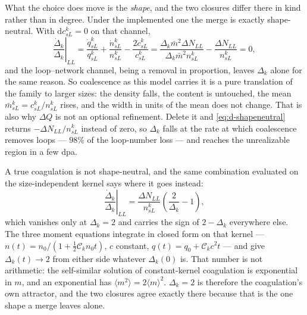 What the choice does move is the \emph{shape}, and the two closures differ there
in kind rather than in degree. Under the implemented one the merge is exactly
shape-neutral. With $\mathrm dc^k_{sL}=0$ on that channel,
\begin{equation}
  \left.\frac{\dot\Delta_k}{\Delta_k}\right|_{LL}
   =\frac{\dot q^k_{sL}}{q^k_{sL}}+\frac{\dot n^k_{sL}}{n^k_{sL}}
    -\frac{2\dot c^k_{sL}}{c^k_{sL}}
   =\frac{\Delta_k\bar m^{2}\Delta N_{LL}}{\Delta_k\bar m^{2}n^k_{sL}}
    -\frac{\Delta N_{LL}}{n^k_{sL}}=0 ,
  \label{eq:d-shapeneutral}
\end{equation}
and the loop--network channel, being a removal in proportion, leaves $\Delta_k$
alone for the same reason. So coalescence as this model carries it is a pure
translation of the family to larger sizes: the density falls, the content is
untouched, the mean $\bar m^k_{sL}=c^k_{sL}/n^k_{sL}$ rises, and the width in
units of the mean does not change. That is also why $\Delta Q$ is not an
optional refinement. Delete it and \cref{eq:d-shapeneutral} returns
$-\Delta N_{LL}/n^k_{sL}$ instead of zero, so $\Delta_k$ falls at the rate at
which coalescence removes loops --- $98\%$ of the loop-number loss --- and
reaches the unrealizable region in a few dpa.

A true coagulation is not shape-neutral, and the same combination evaluated on
the size-independent kernel says where it goes instead:
\begin{equation}
  \left.\frac{\dot\Delta_k}{\Delta_k}\right|_{LL}
   =\frac{\Delta N_{LL}}{n^k_{sL}}\left(\frac{2}{\Delta_k}-1\right),
  \label{eq:d-deltaflow}
\end{equation}
which vanishes only at $\Delta_k=2$ and carries the sign of $2-\Delta_k$
everywhere else. The three moment equations integrate in closed form on that
kernel --- $n(t)=n_0/(1+\tfrac12\mathcal C_kn_0t)$, $c$ constant,
$q(t)=q_0+\mathcal C_kc^{2}t$ --- and give
$\Delta_k(t)\to2$ from either side whatever $\Delta_k(0)$ is. That number is
not arithmetic: the self-similar solution of constant-kernel coagulation is
exponential in $m$, and an exponential has $\langle m^{2}\rangle=2\langle
m\rangle^{2}$. $\Delta_k=2$ is therefore the coagulation's own attractor, and
the two closures agree exactly there because that is the one shape a merge
leaves alone.


